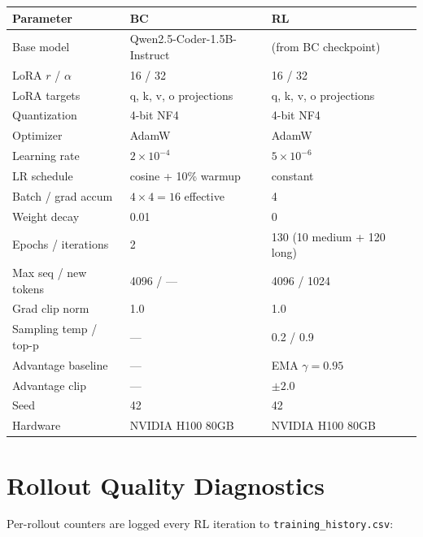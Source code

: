 \documentclass{article}
\begin{document}
\begin{center}
\small
\begin{tabular}{@{}llll@{}}
\toprule
Parameter & BC & RL \\
\midrule
Base model            & Qwen2.5-Coder-1.5B-Instruct & (from BC checkpoint) \\
LoRA $r$ / $\alpha$   & 16 / 32 & 16 / 32 \\
LoRA targets          & q, k, v, o projections & q, k, v, o projections \\
Quantization          & 4-bit NF4 & 4-bit NF4 \\
Optimizer             & AdamW & AdamW \\
Learning rate         & $2\times10^{-4}$ & $5\times10^{-6}$ \\
LR schedule           & cosine + 10\% warmup & constant \\
Batch / grad accum    & $4\times4{=}16$ effective & 4 \\
Weight decay          & 0.01 & 0 \\
Epochs / iterations   & 2 & 130 (10 medium + 120 long) \\
Max seq / new tokens  & 4096 / --- & 4096 / 1024 \\
Grad clip norm        & 1.0 & 1.0 \\
Sampling temp / top-p & --- & 0.2 / 0.9 \\
Advantage baseline    & --- & EMA $\gamma{=}0.95$ \\
Advantage clip        & --- & $\pm2.0$ \\
Seed                  & 42 & 42 \\
Hardware              & NVIDIA H100 80GB & NVIDIA H100 80GB \\
\bottomrule
\end{tabular}
\end{center}

\section{Rollout Quality Diagnostics}

Per-rollout counters are logged every RL iteration to \texttt{training\_history.csv}:
\end{document}
